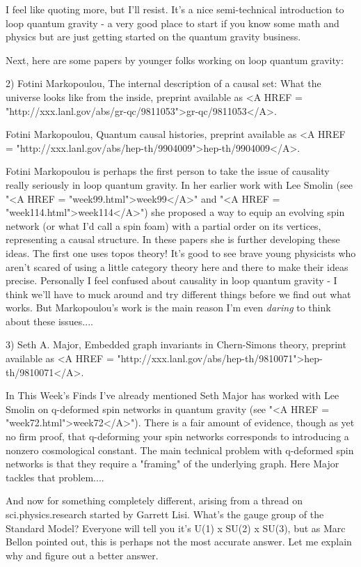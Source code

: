 I feel like quoting more, but I'll resist.  It's a nice semi-technical
introduction to loop quantum gravity - a very good place to start if you
know some math and physics but are just getting started on the quantum
gravity business.

Next, here are some papers by younger folks working on loop quantum
gravity:

2) Fotini Markopoulou, The internal description of a causal set: What
the universe looks like from the inside, preprint available as
<A HREF = "http://xxx.lanl.gov/abs/gr-qc/9811053">gr-qc/9811053</A>.  

Fotini Markopoulou, Quantum causal histories, preprint available as
<A HREF = "http://xxx.lanl.gov/abs/hep-th/9904009">hep-th/9904009</A>.   

Fotini Markopoulou is perhaps the first person to take the issue of
causality really seriously in loop quantum gravity.  In her earlier work
with Lee Smolin (see "<A HREF = "week99.html">week99</A>" and "<A HREF = "week114.html">week114</A>") she proposed a way to equip an 
evolving spin network (or what I'd call a spin foam) with a partial order on 
its vertices, representing a causal structure.  In these papers she is
further developing these ideas.  The first one uses topos theory!  It's
good to see brave young physicists who aren't scared of using a little
category theory here and there to make their ideas precise.  Personally 
I feel confused about causality in loop quantum gravity - I think we'll
have to muck around and try different things before we find out what 
works.  But Markopoulou's work is the main reason I'm even \emph{daring} to 
think about these issues....


 3) Seth A. Major, Embedded graph invariants in Chern-Simons theory,
preprint available as <A HREF =
"http://xxx.lanl.gov/abs/hep-th/9810071">hep-th/9810071</A>.


In This Week's Finds I've already mentioned Seth Major has worked with
Lee Smolin on q-deformed spin networks in quantum gravity (see "<A
HREF = "week72.html">week72</A>").  There is a fair amount of
evidence, though as yet no firm proof, that q-deforming your spin
networks corresponds to introducing a nonzero cosmological constant.
The main technical problem with q-deformed spin networks is that they
require a "framing" of the underlying graph.  Here Major
tackles that problem....

And now for something completely different, arising from a thread on
sci.physics.research started by Garrett Lisi.  What's the gauge group
of the Standard Model?  Everyone will tell you it's U(1) x SU(2) x
SU(3), but as Marc Bellon pointed out, this is perhaps not the most
accurate answer.   Let me explain why and figure out a better answer.  

